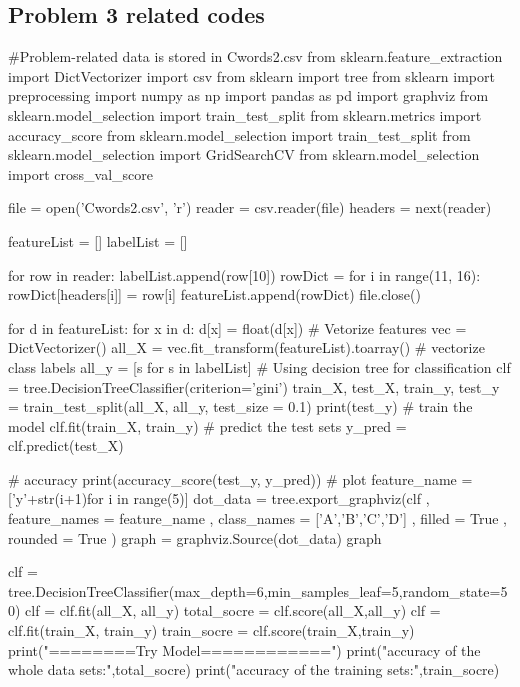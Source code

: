 \documentclass[12pt]{article}
\begin{document}
\subsection{Problem 3 related codes}
\begin{python}
#Problem-related data is stored in Cwords2.csv
    from sklearn.feature_extraction import DictVectorizer
    import csv
    from sklearn import tree
    from sklearn import preprocessing
    import numpy as np
    import pandas as pd
    import graphviz
    from sklearn.model_selection import train_test_split
    from sklearn.metrics import accuracy_score
    from sklearn.model_selection import train_test_split
    from sklearn.model_selection import GridSearchCV
    from sklearn.model_selection import cross_val_score

    file = open('Cwords2.csv', 'r')
    reader = csv.reader(file)
    headers = next(reader)
    
    featureList = []
    labelList = []
    
    for row in reader:
    labelList.append(row[10])
    rowDict = {}
    for i in range(11, 16):
        rowDict[headers[i]] = row[i]
    featureList.append(rowDict)
    file.close()

    for d in featureList:
        for x in d:
            d[x] = float(d[x])
    # Vetorize features
    vec = DictVectorizer()
    all_X = vec.fit_transform(featureList).toarray()
    # vectorize class labels
    all_y = [s for s in labelList]
    # Using decision tree for classification  
    clf = tree.DecisionTreeClassifier(criterion='gini')
    train_X, test_X, train_y, test_y = train_test_split(all_X, all_y, test_size = 0.1)
    print(test_y)
    # train the model
    clf.fit(train_X, train_y)
    # predict the test sets
    y_pred = clf.predict(test_X)

    # accuracy
    print(accuracy_score(test_y, y_pred))
    # plot
    feature_name = ['y'+str(i+1)for i in range(5)]
    dot_data = tree.export_graphviz(clf
                                    , feature_names = feature_name
                                    , class_names = ['A','B','C','D']
                                    , filled = True
                                    , rounded = True
                                )  
    graph = graphviz.Source(dot_data)
    graph

    clf = tree.DecisionTreeClassifier(max_depth=6,min_samples_leaf=5,random_state=50)
    clf         = clf.fit(all_X, all_y)  
    total_socre = clf.score(all_X,all_y)
    clf         = clf.fit(train_X, train_y)  
    train_socre = clf.score(train_X,train_y)
    print("\n========Try Model============")
    print("accuracy of the whole data sets:",total_socre)
    print("accuracy of the training sets:",train_socre)


\end{python}
\end{document}
